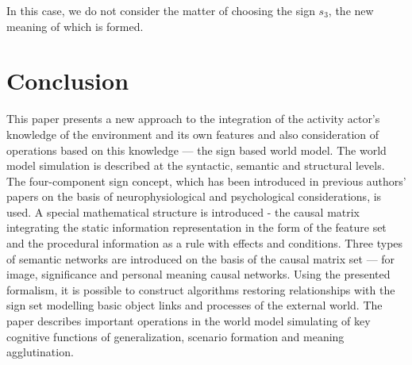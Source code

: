 \documentclass[12pt]{scrartcl}
\begin{document}
	In this case, we do not consider the matter of choosing the sign $s_3$, the new meaning of which is formed.

	\section*{Conclusion}
	This paper presents a new approach to the integration of the activity actor’s knowledge of the environment and its own features and also consideration of operations based on this knowledge --- the sign based world model. The world model simulation is described at the syntactic, semantic and structural levels. The four-component sign concept, which has been introduced in previous authors’ papers on the basis of neurophysiological and psychological considerations, is used. A special mathematical structure is introduced - the causal matrix integrating the static information representation in the form of the feature set and the procedural information as a rule with effects and conditions. Three types of semantic networks are introduced on the basis of the causal matrix set --- for image, significance and personal meaning causal networks. Using the presented formalism, it is possible to construct algorithms restoring relationships with the sign set modelling basic object links and processes of the external world. The paper describes important operations in the world model simulating of key cognitive functions of generalization, scenario formation and meaning agglutination.
	
	\printbibliography
\end{document}
